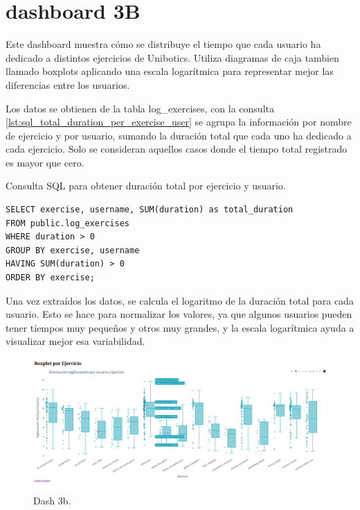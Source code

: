 \documentclass[a4paper, 12pt]{book}
\begin{document}
\section{dashboard 3B}

Este dashboard muestra cómo se distribuye el tiempo que cada usuario ha dedicado a distintos ejercicios de Unibotics. Utiliza diagramas de caja tambien llamado boxplots aplicando una escala logarítmica para representar mejor las diferencias entre los usuarios.

Los datos se obtienen de la tabla log\_exercises, con la consulta \ref{lst:sql_total_duration_per_exercise_user} se agrupa la información por nombre de ejercicio y por usuario, sumando la duración total que cada uno ha dedicado a cada ejercicio. Solo se consideran aquellos casos donde el tiempo total registrado es mayor que cero.

\begin{listing}[h!]
    \caption{Consulta SQL para obtener duración total por ejercicio y usuario.}{}
    \label{lst:sql_total_duration_per_exercise_user}
    \begin{verbatim}
SELECT exercise, username, SUM(duration) as total_duration
FROM public.log_exercises
WHERE duration > 0
GROUP BY exercise, username
HAVING SUM(duration) > 0
ORDER BY exercise;
    \end{verbatim}
\end{listing}

Una vez extraídos los datos, se calcula el logaritmo de la duración total para cada usuario. Esto se hace para normalizar los valores, ya que algunos usuarios pueden tener tiempos muy pequeños y otros muy grandes, y la escala logarítmica ayuda a visualizar mejor esa variabilidad.

\begin{figure}
  \centering
  \includegraphics[width=1.1\textwidth]{img/3bb.png}
  \caption{Dash 3b.}\label{fig:3b}
\end{figure}
\end{document}
